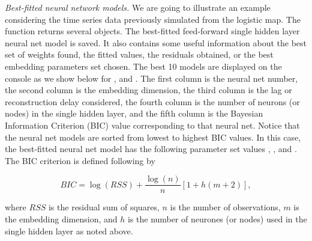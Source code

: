 \textit{Best-fitted neural network models.} We are going to illustrate an example considering the time series data previously simulated from the logistic map. The  function returns several objects. The best-fitted feed-forward single hidden layer neural net model is saved. It also contains some useful information about the best set of weights found, the fitted values, the residuals obtained, or the best embedding parameters set chosen. The best 10 models are displayed on the console as we show below for ,  and . The first column is the neural net number, the second column is the embedding dimension, the third column is the lag or reconstruction delay considered, the fourth column is the number of neurons (or nodes) in the single hidden layer, and the fifth column is the Bayesian Information Criterion (BIC) value corresponding to that neural net. Notice that the neural net models are sorted from lowest to highest BIC values. In this case, the best-fitted neural net model has the following parameter set values , , and . The BIC criterion is defined following \cite {Shintani2003} by

\begin{equation*}
BIC = \log \left( {RSS} \right) + \frac{{\log \left( n \right)}}{n}\left[ {1 + h\left( {m + 2} \right)} \right],
\end{equation*}  

\noindent where $RSS$ is the residual sum of squares, $n$ is the number of observations, $m$ is the embedding dimension, and $h$ is the number of neurones (or nodes) used in the single hidden layer as noted above.


